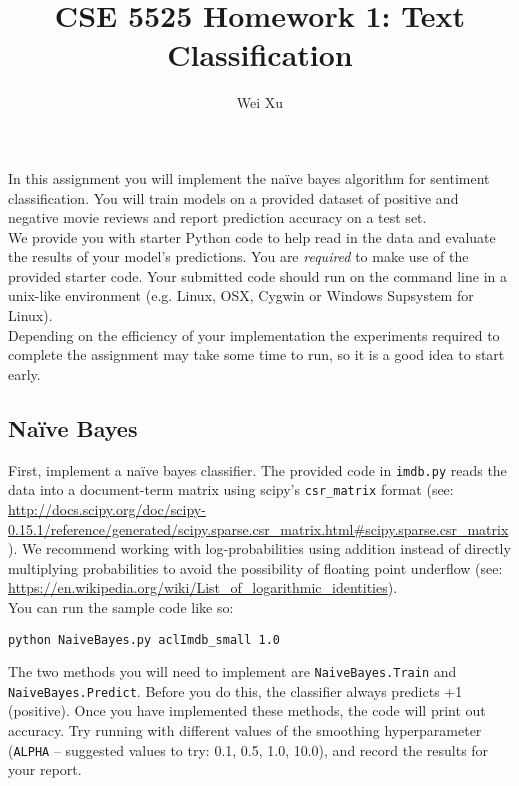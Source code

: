 \documentclass[12pt, letterpaper]{article}
\begin{document}
\title{CSE 5525 Homework 1: Text Classification}
\author{Wei Xu}
\date{}
\maketitle
 
In this assignment you will implement the na\"{i}ve bayes algorithm for
sentiment classification. You will train  models on a provided dataset of positive
and negative movie reviews and report prediction accuracy on a test set. \\

We provide you with starter Python code to help read in the data and evaluate the results of your model's predictions.
You are \emph{required} to make use of the provided starter code. Your submitted code
should run on the command line in a unix-like environment (e.g. Linux, OSX, Cygwin or Windows Supsystem for Linux). \\

Depending on the efficiency of your implementation the experiments required to complete the assignment may take some
time to run, so it is a good idea to start early.

\subsection*{Na\"{i}ve Bayes}
First, implement a na\"{i}ve bayes classifier.  The provided code in {\tt imdb.py} reads the data into a document-term matrix
using scipy's {\tt csr\_matrix} format (see: \url{http://docs.scipy.org/doc/scipy-0.15.1/reference/generated/scipy.sparse.csr_matrix.html#scipy.sparse.csr_matrix}).
We recommend working with log-probabilities using addition instead of directly multiplying probabilities to avoid the possibility of floating point underflow (see: \url{https://en.wikipedia.org/wiki/List_of_logarithmic_identities}).\\

\noindent You can run the sample code like so:
\begin{verbatim}
python NaiveBayes.py aclImdb_small 1.0
\end{verbatim}

The two methods you will need to implement are {\tt NaiveBayes.Train} and {\tt NaiveBayes.Predict}.  Before you do this, the classifier always predicts +1 (positive).
Once you have implemented these methods, the code will print out accuracy.  Try running with different values of the smoothing hyperparameter ({\tt ALPHA} -- suggested values to try: 0.1, 0.5, 1.0, 10.0),
and record the results for your report.
\end{document}
